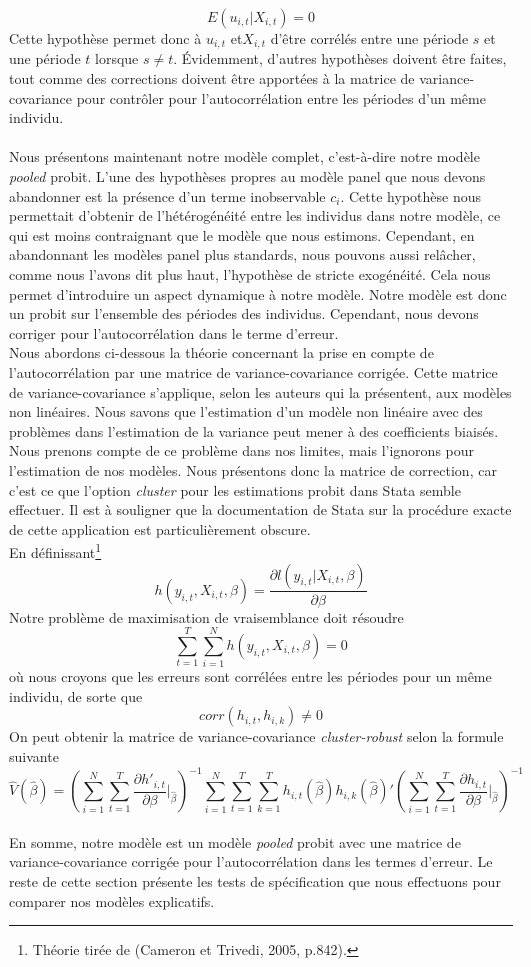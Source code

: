\documentclass[a4paper, oneside, titlepage]{article}
\begin{document}
\[E(u_{i,t}|X_{i,t})=0\]
Cette hypothèse permet donc à $u_{i,t}$ et$X_{i,t}$ d'être corrélés entre une période $s$ et une période $t$ lorsque $s\ne t$. Évidemment, d'autres hypothèses doivent être faites, tout comme des corrections doivent être apportées à la matrice de variance-covariance pour contrôler pour l'autocorrélation entre les périodes d'un même individu.
\\
\\
Nous présentons maintenant notre modèle complet, c'est-à-dire notre modèle \textit{pooled} probit. L'une des hypothèses propres au modèle panel que nous devons abandonner est la présence d'un terme inobservable $c_i$. Cette hypothèse nous permettait d'obtenir de l'hétérogénéité entre les individus dans notre modèle, ce qui est moins contraignant que le modèle que nous estimons. Cependant, en abandonnant les modèles panel plus standards, nous pouvons aussi relâcher, comme nous l'avons dit plus haut, l'hypothèse de stricte exogénéité. Cela nous permet d'introduire un aspect dynamique à notre modèle. Notre modèle est donc un probit sur l'ensemble des périodes des individus. Cependant, nous devons corriger pour l'autocorrélation dans le terme d'erreur. 
\\
Nous abordons ci-dessous la théorie concernant la prise en compte de l'autocorrélation par une matrice de variance-covariance corrigée. Cette matrice de variance-covariance s'applique, selon les auteurs qui la présentent, aux modèles non linéaires. Nous savons que l'estimation d'un modèle non linéaire avec des problèmes dans l'estimation de la variance peut mener à des coefficients biaisés. Nous prenons compte de ce problème dans nos limites, mais l'ignorons pour l'estimation de nos modèles. Nous présentons donc la matrice de correction, car c'est ce que l'option \textit{cluster} pour les estimations probit dans Stata semble effectuer. Il est à souligner que la documentation de Stata sur la procédure exacte de cette application est particulièrement obscure. 
\\
En définissant\footnote{Théorie tirée de (Cameron et Trivedi, 2005, p.842).}
\[h(y_{i,t},X_{i,t},\beta)=\frac{\partial l(y_{i,t}|X_{i,t},\beta)}{\partial \beta}\]
Notre problème de maximisation de vraisemblance doit résoudre
\[\sum_{t=1}^T\sum_{i=1}^N h(y_{i,t},X_{i,t},\beta)=0\]
où nous croyons que les erreurs sont corrélées entre les périodes pour un même individu, de sorte que
\[corr(h_{i,t},h_{i,k})\ne 0\]
On peut obtenir la matrice de variance-covariance \textit{cluster-robust} selon la formule suivante
\[\hat{V}(\hat{\beta})=\left(\sum_{i=1}^N \sum_{t=1}^T \frac{\partial h'_{i,t}}{\partial \beta} \bigg|_{\hat{\beta}}\right)^{-1}\sum_{i=1}^N \sum_{t=1}^T\sum_{k=1}^T h_{i,t}(\hat{\beta})h_{i,k}(\hat{\beta})'\left(\sum_{i=1}^N \sum_{t=1}^T \frac{\partial h_{i,t}}{\partial \beta} \bigg|_{\hat{\beta}}\right)^{-1}\]
\\
En somme, notre modèle est un modèle \textit{pooled} probit avec une matrice de variance-covariance corrigée pour l'autocorrélation dans les termes d'erreur. Le reste de cette section présente les tests de spécification que nous effectuons pour comparer nos modèles explicatifs.
\end{document}

